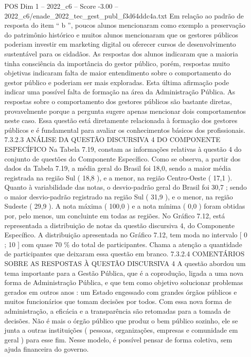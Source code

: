 \begin{textsample}{POS Dim 1 – 2022\_c6 – Score -3.00 – 2022\_c6/enade\_2022\_tec\_gest\_publ\_f3d64ddc4a.txt}
Em relação ao padrão de resposta do item “ b ”, poucos alunos mencionaram como exemplo a preservação do patrimônio histórico e muitos alunos mencionaram que os gestores públicos poderiam investir em marketing digital ou oferecer cursos de desenvolvimento sustentável para os cidadãos.
As respostas dos alunos indicaram que a maioria tinha consciência da importância do gestor público, porém, respostas muito objetivas indicaram falta de maior entendimento sobre o comportamento do gestor público e poderiam ser mais exploradas.
Esta última afirmação pode indicar uma possível falta de formação na área da Administração Pública.
As respostas sobre o comportamento dos gestores públicos são bastante diretas, provavelmente porque a pergunta sugere apenas mencionar dois comportamentos neste caso.
Essa questão está diretamente relacionada à formação dos gestores públicos e é fundamental para avaliar os conhecimentos básicos dos profissionais. 7.3.2.3 ANÁLISE DA QUESTÃO DISCURSIVA 4 DO COMPONENTE ESPECÍFICO Na Tabela 7.19, constam as informações relativas à questão 4 do conjunto de questões do Componente Específico.
Como se observa, a partir dos dados da Tabela 7.19, a média geral do Brasil foi 18,0, sendo a maior média registrada na região Sul ( 18,8 ), e a menor, na região Centro-Oeste ( 17,1 ).
Quanto à variabilidade das notas, o desvio-padrão geral do Brasil foi 30,7 ; sendo o maior desvio-padrão registrado na região Sul ( 31,9 ), e o menor, na região Sudeste ( 29,9 ).
A nota máxima ( 100,0 ) e a nota mínima ( 0,0 ) foram obtidas por, pelo menos, um concluinte em todas as regiões.
No Gráfico 7.12, está representada a distribuição de notas da questão discursiva 4, do Componente Específico.
A distribuição apresentada no Gráfico 7.12, tem moda no intervalo [ 0 ; 10 ] com quase 70 \% do total de participantes.
Chama a atenção a quantidade de participantes que deixaram essa questão em branco. 7.3.2.4 COMENTÁRIOS SOBRE AS RESPOSTAS À QUESTÃO DISCURSIVA 4 A questão abordou um tema importante para a Gestão Pública, que é a coprodução, ligada a uma nova forma de Administração Pública, e que tem como objetivo solucionar problemas gerados em outros anos : um Estado engessado com grandes órgãos públicos e muitos funcionários que tomam decisões por todos.
Com essa nova forma de administração, a eficácia e a transparência são retomadas para a tomada de decisões.
Não é mais o órgão público que produz o bem público sozinho, ele se junta a outras instituições ( pessoas, organizações, empresas e comunidade em geral ) para esse fim.
Nesse modelo, é possível pensar de forma coletiva, sem ajuda financeira do governo.

\end{textsample}
